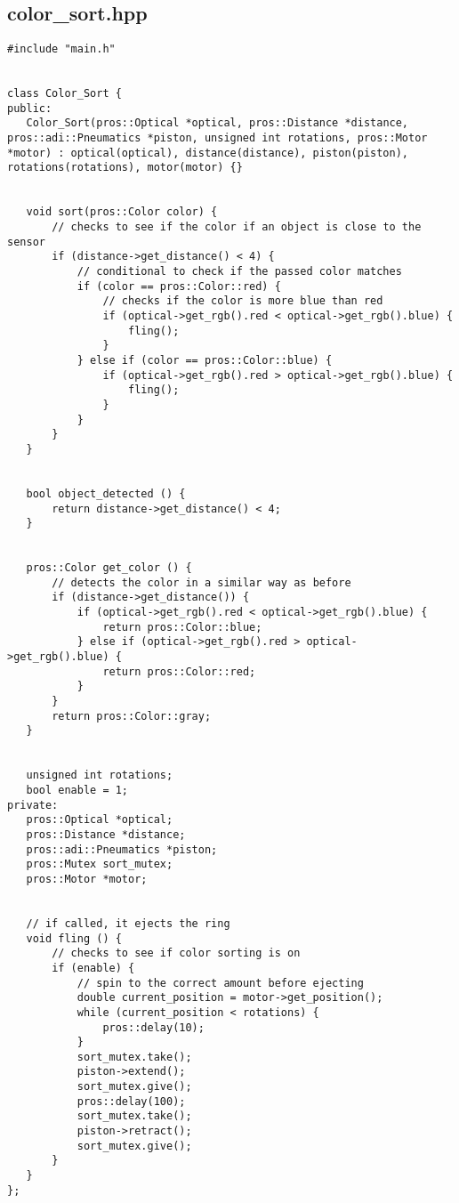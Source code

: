     

\subsection*{color_sort.hpp}
\begin{verbatim}
#include "main.h"


class Color_Sort {
public:
   Color_Sort(pros::Optical *optical, pros::Distance *distance, pros::adi::Pneumatics *piston, unsigned int rotations, pros::Motor *motor) : optical(optical), distance(distance), piston(piston), rotations(rotations), motor(motor) {}


   void sort(pros::Color color) {
       // checks to see if the color if an object is close to the sensor
       if (distance->get_distance() < 4) {
           // conditional to check if the passed color matches
           if (color == pros::Color::red) {
               // checks if the color is more blue than red
               if (optical->get_rgb().red < optical->get_rgb().blue) {
                   fling();
               }
           } else if (color == pros::Color::blue) {
               if (optical->get_rgb().red > optical->get_rgb().blue) {
                   fling();
               }
           }
       }
   }


   bool object_detected () {
       return distance->get_distance() < 4;
   }


   pros::Color get_color () {
       // detects the color in a similar way as before
       if (distance->get_distance()) {
           if (optical->get_rgb().red < optical->get_rgb().blue) {
               return pros::Color::blue;
           } else if (optical->get_rgb().red > optical->get_rgb().blue) {
               return pros::Color::red;
           }
       }
       return pros::Color::gray;
   }


   unsigned int rotations;
   bool enable = 1;
private:
   pros::Optical *optical;
   pros::Distance *distance;
   pros::adi::Pneumatics *piston;
   pros::Mutex sort_mutex;
   pros::Motor *motor;


   // if called, it ejects the ring
   void fling () {
       // checks to see if color sorting is on
       if (enable) {
           // spin to the correct amount before ejecting
           double current_position = motor->get_position();
           while (current_position < rotations) {
               pros::delay(10);
           }
           sort_mutex.take();
           piston->extend();
           sort_mutex.give();
           pros::delay(100);
           sort_mutex.take();
           piston->retract();
           sort_mutex.give();
       }
   }
};


\end{verbatim}
